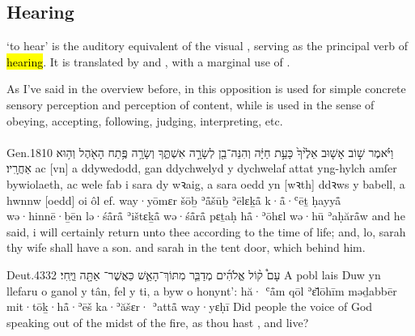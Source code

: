 \subsection{Hearing}


\begin{paper}
	{\click}  ‘to hear’ is the auditory equivalent of the visual , serving as the principal verb of \hl{hearing}. It is translated by  and , with a marginal use of .

	As I’ve said in the overview before,  in this opposition is used for simple concrete sensory perception and perception of content, while  is used in the sense of obeying, accepting, following, judging, interpreting, etc.
\end{paper}



\paragraph{}


\begin{example}{Gen.}{18}{10}{}{}
	\quoling
	{וַיֹּ֗אמֶר שׁ֣וֹב אָשׁ֤וּב אֵלֶ֙יךָ֙ כָּעֵ֣ת חַיָּ֔ה וְהִנֵּה־בֵ֖ן לְשָׂרָ֣ה אִשְׁתֶּ֑ךָ וְשָׂרָ֥ה  פֶּ֥תַח הָאֹ֖הֶל וְה֥וּא אַחֲרָֽיו׃}
	{ac [vn] a ddywedodd, gan ddychwelyd y dychwelaf attat yng-hylch amſer bywiolaeth, ac wele fab i sara dy wꝛaig, a sara oedd yn  [wꝛth] ddꝛws y babell, a hwnnw [oedd] oi ôl ef.}
	{way·yōmɛr šōḇ ʾå̄šūḇ ʾēlɛḵå̄ k·å̄·ʿēṯ ḥayyå̄ wə·hinnē·ḇēn lə·śå̄rå̄ ʾištɛḵå̄ wə·śå̄rå̄  pɛṯaḥ hå̄·ʾōhɛl wə·hū ʾaḥărå̄w}
	{and he said, i will certainly return unto thee according to the time of life; and, lo, sarah thy wife shall have a son. and sarah   in the tent door, which  behind him.}
\end{example}

\begin{example}{Deut.}{4}{33}{2}{}
	\quoling
	{ עָם֩ ק֨וֹל אֱלֹהִ֜ים מְדַבֵּ֧ר מִתּוֹךְ־הָאֵ֛שׁ כַּאֲשֶׁר־ אַתָּ֖ה וַיֶּֽחִי׃}
	{A  pobl lais Duw yn llefaru o ganol y tân, fel y  ti, a byw o honynt’:}
	{hă· ʿå̄m qōl ʾɛ̆lōhīm məḏabbēr mit·tōḵ·hå̄·ʾēš ka·ʾăšɛr· ʾattå̄ way·yɛḥī}
	{Did  people  the voice of God speaking out of the midst of the fire, as thou hast , and live?}
\end{example}



